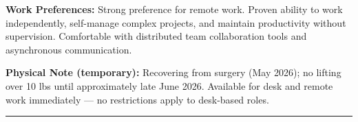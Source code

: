 \documentclass[9pt,letterpaper]{extarticle}
\begin{document}
\vspace{4pt}
\textbf{Work Preferences:} Strong preference for remote work. Proven ability to work independently, self-manage complex projects, and maintain productivity without supervision. Comfortable with distributed team collaboration tools and asynchronous communication.

\vspace{4pt}
\textbf{Physical Note (temporary):} Recovering from surgery (May 2026); no lifting over 10 lbs until approximately late June 2026. Available for desk and remote work immediately --- no restrictions apply to desk-based roles.

\vspace{8pt}
\noindent\rule{\linewidth}{0.4pt}

\vspace{3pt}
\end{document}
